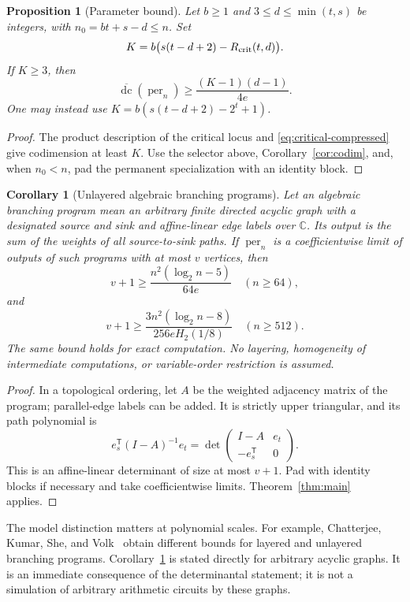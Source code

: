 \documentclass[11pt]{article}
\newtheorem{proposition}[theorem]{Proposition}
\newtheorem{corollary}[theorem]{Corollary}
\theoremstyle{remark}\newtheorem{remark}[theorem]{Remark}
\DeclareMathOperator{\per}{per}
\DeclareMathOperator{\dc}{dc}
\newcommand{\bdc}{\overline{\dc}}
\newcommand{\C}{\mathbb C}
\begin{document}
\begin{proposition}[Parameter bound]\label{prop:parameters}
Let $b\ge1$ and $3\le d\le\min(t,s)$ be integers, with
$n_0=bt+s-d\le n$. Set
\[
 K=b\bigl(s(t-d+2)-R_{\rm crit}(t,d)\bigr).
\]
If $K\ge3$, then
\[
 \bdc(\per_n)\ge\frac{(K-1)(d-1)}{4e}.
\]
One may instead use $K=b(s(t-d+2)-2^t+1)$.
\end{proposition}
\begin{proof}
The product description of the critical locus and
\eqref{eq:critical-compressed} give codimension at least $K$.
Use the selector above, Corollary~\ref{cor:codim}, and, when $n_0<n$,
pad the permanent specialization with an identity block.
\end{proof}



\begin{corollary}[Unlayered algebraic branching programs]\label{cor:abp}
Let an algebraic branching program mean an arbitrary finite directed
acyclic graph with a designated source and sink and affine-linear
edge labels over $\C$. Its output is the sum of the weights of all
source-to-sink paths. If $\per_n$ is a coefficientwise limit of outputs
of such programs with at most $v$ vertices, then
\[
 v+1\ge \frac{n^2(\log_2 n-5)}{64e}\quad(n\ge64),
\]
and
\[
 v+1\ge \frac{3n^2(\log_2 n-8)}{256eH_2(1/8)}\quad(n\ge512).
\]
The same bound holds for exact computation. No layering, homogeneity
of intermediate computations, or variable-order restriction is assumed.
\end{corollary}

\begin{proof}
In a topological ordering, let $A$ be the weighted adjacency matrix
of the program; parallel-edge labels can be added. It is strictly
upper triangular, and its path polynomial is
\[
 e_s^{\mathsf T}(I-A)^{-1}e_t
   =\det\begin{pmatrix}I-A&e_t\\-e_s^{\mathsf T}&0\end{pmatrix}.
\]
This is an affine-linear determinant of size at most $v+1$. Pad with
identity blocks if necessary and take coefficientwise limits.
Theorem~\ref{thm:main} applies.
\end{proof}

The model distinction matters at polynomial scales. For example,
Chatterjee, Kumar, She, and Volk~\cite[Theorems 1.2 and 1.3]{CKSV}
obtain different bounds for layered and unlayered branching programs.
Corollary~\ref{cor:abp} is stated directly for arbitrary acyclic graphs.
It is an immediate consequence of the determinantal statement; it is
not a simulation of arbitrary arithmetic circuits by these graphs.
\end{document}
